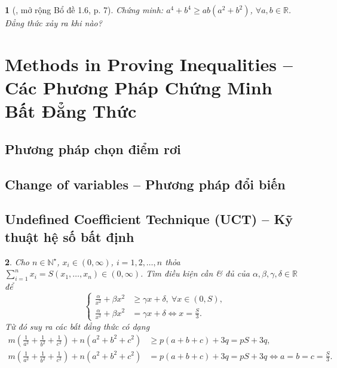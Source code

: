 \documentclass{article}
\newtheorem{baitoan}{}
\begin{document}
\begin{baitoan}[\cite{Son_Nghiep_Trung_Can_bdt}, mở rộng Bổ đề 1.6, p. 7]
	Chứng minh: $a^4 + b^4\ge ab(a^2 + b^2)$, $\forall a,b\in\mathbb{R}$. Đẳng thức xảy ra khi nào?
\end{baitoan}


\section{Methods in Proving Inequalities -- Các Phương Pháp Chứng Minh Bất Đẳng Thức}

\subsection{Phương pháp chọn điểm rơi}

\subsection{Change of variables -- Phương pháp đổi biến}

\subsection{Undefined Coefficient Technique (UCT) -- Kỹ thuật hệ số bất định}

\begin{baitoan}
	Cho $n\in\mathbb{N}^\star$, $x_i\in(0,\infty)$, $i = 1,2,\ldots,n$ thỏa $\sum_{i=1}^n x_i = S(x_1,\ldots,x_n)\in(0,\infty)$. Tìm điều kiện cần \& đủ của $\alpha,\beta,\gamma,\delta\in\mathbb{R}$  để
	\begin{equation*}
		\left\{\begin{split}
			\frac{\alpha}{x^2} + \beta x^2&\ge\gamma x + \delta,\ \forall x\in(0,S),\\
			\frac{\alpha}{x^2} + \beta x^2 &= \gamma x + \delta\Leftrightarrow x = \frac{S}{3}.
		\end{split}\right.
	\end{equation*}
	Từ đó suy ra các bất đẳng thức có dạng
	\begin{align}
		m\left(\frac{1}{a^2} + \frac{1}{b^2} + \frac{1}{c^2}\right) + n(a^2 + b^2 + c^2)&\ge p(a + b + c) + 3q = pS + 3q,\\
		m\left(\frac{1}{a^2} + \frac{1}{b^2} + \frac{1}{c^2}\right) + n(a^2 + b^2 + c^2) &= p(a + b + c) + 3q = pS + 3q\Leftrightarrow a = b = c = \frac{S}{3}.
	\end{align}
\end{baitoan}
\end{document}
